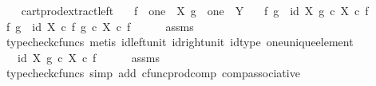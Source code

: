 \begin{isabellebody}
\ \ \isamarkupfalse%
\isanewline
{}\isamarkupfalse%
%
\endisatagproof
{\isafoldproof}%
%
\isadelimproof
\isanewline
%
\endisadelimproof
\isanewline
{}\isamarkupfalse%
\ cart{\isacharunderscore}{\kern0pt}prod{\isacharunderscore}{\kern0pt}extract{\isacharunderscore}{\kern0pt}left{\isacharcolon}{\kern0pt}\isanewline
\ \ \ {\isachardoublequoteopen}f\ {\isacharcolon}{\kern0pt}\ one\ {\isasymrightarrow}\ X{\isachardoublequoteclose}\ {\isachardoublequoteopen}g\ {\isacharcolon}{\kern0pt}\ one\ {\isasymrightarrow}\ Y{\isachardoublequoteclose}\isanewline
\ \ \ {\isachardoublequoteopen}{\isasymlangle}f{\isacharcomma}{\kern0pt}\ g{\isasymrangle}\ {\isacharequal}{\kern0pt}\ {\isasymlangle}id\ X{\isacharcomma}{\kern0pt}\ g\ {\isasymcirc}\isactrlsub c\ {\isasymbeta}\isactrlbsub X\isactrlesub {\isasymrangle}\ {\isasymcirc}\isactrlsub c\ f{\isachardoublequoteclose}\isanewline
%
\isadelimproof
%
\endisadelimproof
%
\isatagproof
{}\isamarkupfalse%
\ {\isacharminus}{\kern0pt}\isanewline
\ \ \isamarkupfalse%
\ {\isachardoublequoteopen}{\isasymlangle}f{\isacharcomma}{\kern0pt}\ g{\isasymrangle}\ {\isacharequal}{\kern0pt}\ {\isasymlangle}id\ X\ {\isasymcirc}\isactrlsub c\ f{\isacharcomma}{\kern0pt}\ g\ {\isasymcirc}\isactrlsub c\ {\isasymbeta}\isactrlbsub X\isactrlesub \ {\isasymcirc}\isactrlsub c\ f{\isasymrangle}{\isachardoublequoteclose}\isanewline
\ \ \ \ \isamarkupfalse%
\ assms\ \isamarkupfalse%
\ {\isacharparenleft}{\kern0pt}typecheck{\isacharunderscore}{\kern0pt}cfuncs{\isacharcomma}{\kern0pt}\ metis\ id{\isacharunderscore}{\kern0pt}left{\isacharunderscore}{\kern0pt}unit{}\ id{\isacharunderscore}{\kern0pt}right{\isacharunderscore}{\kern0pt}unit{}\ id{\isacharunderscore}{\kern0pt}type\ one{\isacharunderscore}{\kern0pt}unique{\isacharunderscore}{\kern0pt}element{\isacharparenright}{\kern0pt}\isanewline
\ \ \isamarkupfalse%
\ \isamarkupfalse%
\ {\isachardoublequoteopen}{\isachardot}{\kern0pt}{\isachardot}{\kern0pt}{\isachardot}{\kern0pt}\ {\isacharequal}{\kern0pt}\ {\isasymlangle}id\ X{\isacharcomma}{\kern0pt}\ g\ {\isasymcirc}\isactrlsub c\ {\isasymbeta}\isactrlbsub X\isactrlesub {\isasymrangle}\ {\isasymcirc}\isactrlsub c\ f{\isachardoublequoteclose}\isanewline
\ \ \ \ \isamarkupfalse%
\ assms\ \isamarkupfalse%
\ {\isacharparenleft}{\kern0pt}typecheck{\isacharunderscore}{\kern0pt}cfuncs{\isacharcomma}{\kern0pt}\ simp\ add{\isacharcolon}{\kern0pt}\ cfunc{\isacharunderscore}{\kern0pt}prod{\isacharunderscore}{\kern0pt}comp\ comp{\isacharunderscore}{\kern0pt}associative{}{\isacharparenright}{\kern0pt}\isanewline

\end{isabellebody}
